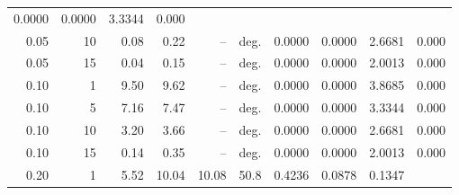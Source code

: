 \begin{table}[!htb]
\begin{tabular}{r r r r r r r r r r}
    0.0000                 & 0.0000                       & 3.3344        &
    0.000                                                                            \\
    0.05                   & 10                           & 0.08          & 0.22
                           & --                           & deg.          &
    0.0000                 & 0.0000                       & 2.6681        &
    0.000                                                                            \\
    0.05                   & 15                           & 0.04          & 0.15
                           & --                           & deg.          &
    0.0000                 & 0.0000                       & 2.0013        &
    0.000                                                                            \\
    \midrule
    0.10                   & 1                            & 9.50          & 9.62
                           & --                           & deg.          &
    0.0000                 & 0.0000                       & 3.8685        &
    0.000                                                                            \\
    0.10                   & 5                            & 7.16          & 7.47
                           & --                           & deg.          &
    0.0000                 & 0.0000                       & 3.3344        &
    0.000                                                                            \\
    0.10                   & 10                           & 3.20          & 3.66
                           & --                           & deg.          &
    0.0000                 & 0.0000                       & 2.6681        &
    0.000                                                                            \\
    0.10                   & 15                           & 0.14          & 0.35
                           & --                           & deg.          &
    0.0000                 & 0.0000                       & 2.0013        &
    0.000                                                                            \\
    \midrule
    0.20                   & 1                            & 5.52          &
    10.04                  & 10.08                        & 50.8
                           & 0.4236                       & 0.0878        & 0.1347 &

\end{tabular}
\end{table}
